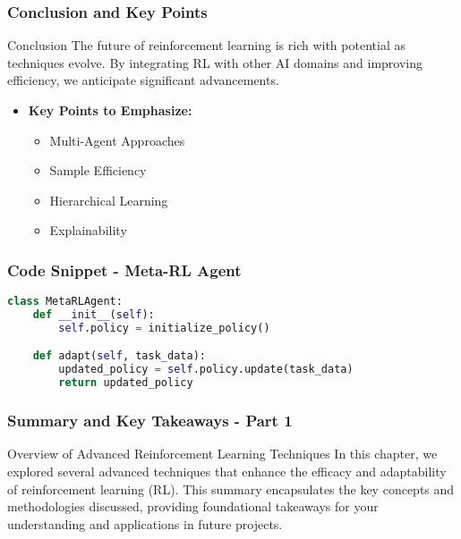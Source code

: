 \documentclass[aspectratio=169]{beamer}
\begin{document}
\begin{frame}[fragile]
    \frametitle{Conclusion and Key Points}
    \begin{block}{Conclusion}
        The future of reinforcement learning is rich with potential as techniques evolve. By integrating RL with other AI domains and improving efficiency, we anticipate significant advancements.
    \end{block}
    \begin{itemize}
        \item \textbf{Key Points to Emphasize:}
        \begin{itemize}
            \item Multi-Agent Approaches
            \item Sample Efficiency
            \item Hierarchical Learning
            \item Explainability
        \end{itemize}
    \end{itemize}
\end{frame}

\begin{frame}[fragile]
    \frametitle{Code Snippet - Meta-RL Agent}
    \begin{lstlisting}[language=Python]
class MetaRLAgent:
    def __init__(self):
        self.policy = initialize_policy()

    def adapt(self, task_data):
        updated_policy = self.policy.update(task_data)
        return updated_policy
    \end{lstlisting}
\end{frame}

\begin{frame}[fragile]
    \frametitle{Summary and Key Takeaways - Part 1}
    \begin{block}{Overview of Advanced Reinforcement Learning Techniques}
        In this chapter, we explored several advanced techniques that enhance the efficacy and adaptability of reinforcement learning (RL). This summary encapsulates the key concepts and methodologies discussed, providing foundational takeaways for your understanding and applications in future projects.
    \end{block}
\end{frame}
\end{document}
